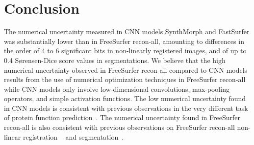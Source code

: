 

\section*{Conclusion}

The numerical uncertainty measured in CNN models SynthMorph and FastSurfer was substantially lower than in FreeSurfer recon-all, amounting to differences in the order of 4 to 6 significant bits in non-linearly registered images, and of up to 0.4 Sørensen-Dice score values in segmentations. 
We believe that the high numerical uncertainty observed in FreeSurfer recon-all compared to CNN models results from the use of numerical optimization techniques in FreeSurfer recon-all while CNN models only involve low-dimensional convolutions, max-pooling operators, and simple activation functions. The low numerical uncertainty found in CNN models is consistent with previous observations in the very different task of protein function prediction~\cite{pepe2022numerical}. The numerical uncertainty found in FreeSurfer recon-all is also consistent with previous observations on FreeSurfer recon-all non-linear registration ~\cite{salari2021accurate} and segmentation~\cite{salari2020file}.

